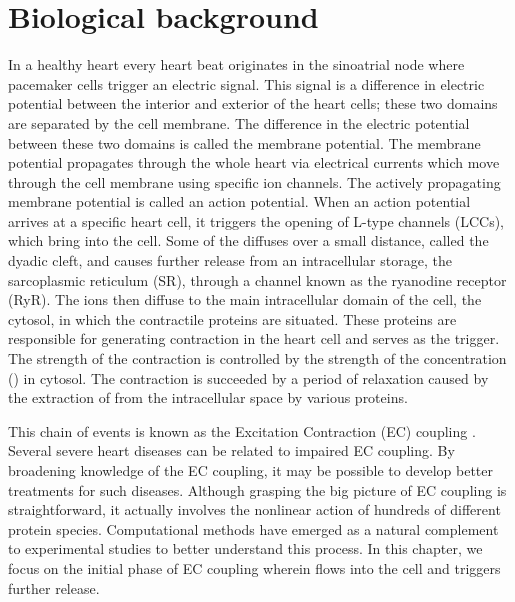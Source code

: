 \section{Biological background}
 

In a healthy heart every heart beat originates in the sinoatrial node
where pacemaker cells trigger an electric signal. This signal is a
difference in electric potential between the interior and exterior of
the heart cells; these two domains are separated by the cell
membrane. The difference in the electric potential between these two
domains is called the membrane potential. The membrane potential
propagates through the whole heart via electrical currents which move
through the cell membrane using specific ion channels. The actively
propagating membrane potential is called an action potential. When an
action potential arrives at a specific heart cell, it triggers the
opening of L-type \Ca channels (LCCs), which bring \Ca into the
cell. Some of the \Ca diffuses over a small distance, called the
dyadic cleft, and causes further \Ca release from an intracellular \Ca
storage, the sarcoplasmic reticulum (SR), through a channel known as
the ryanodine receptor (RyR). The \Ca ions then diffuse to the main
intracellular domain of the cell, the cytosol, in which the
contractile proteins are situated. These proteins are responsible for
generating contraction in the heart cell and \Ca serves as the
trigger. The strength of the contraction is controlled by the strength
of the \Ca concentration (\CaC) in cytosol. The contraction is
succeeded by a period of relaxation caused by the extraction of \Ca
from the intracellular space by various proteins.

This chain of events is known as the Excitation Contraction (EC)
coupling \citep{Bers2001}. Several severe heart diseases can be related
to impaired EC coupling. By broadening knowledge of the EC coupling,
it may be possible to develop better treatments for such
diseases. Although grasping the big picture of EC coupling is
straightforward, it actually involves the nonlinear action of hundreds
of different protein species. Computational methods have emerged as a
natural complement to experimental studies to better understand this
process. In this chapter, we focus on the initial phase of EC
coupling wherein \Ca flows into the cell and triggers further \Ca
release.

